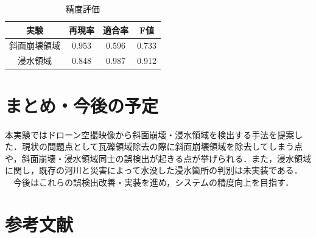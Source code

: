 \documentclass[a4paper, twocolumn, xelatex, 9pt, ja=standard, Ligatures=TeX]{bxjsarticle}
\begin{document}
	\begin{table}[h]
		\centering
		\caption{精度評価}
		\label{tab04}
		\begin{tabular}{c c c c}
			\hline
				実験 & 再現率 & 適合率 & F値 \\ \hline
				斜面崩壊領域 & 0.953 & 0.596 & 0.733 \\
				浸水領域 & 0.848 & 0.987 & 0.912 \\ \hline
		\end{tabular}
	\end{table}

\section{まとめ・今後の予定}
	本実験ではドローン空撮映像から斜面崩壊・浸水領域を検出する手法を提案した．現状の問題点として瓦礫領域除去の際に斜面崩壊領域を除去してしまう点や，斜面崩壊・浸水領域同士の誤検出が起きる点が挙げられる．また，浸水領域に関し，既存の河川と災害によって水没した浸水箇所の判別は未実装である．\\
	　今後はこれらの誤検出改善・実装を進め，システムの精度向上を目指す．

\section{参考文献}		

\end{document}
